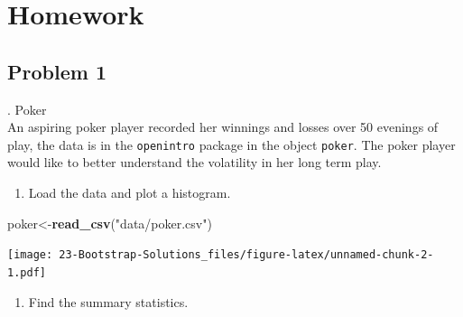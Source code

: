 \documentclass[
]{book}
\newenvironment{Shaded}{\begin{snugshade}}{\end{snugshade}}
\newcommand{\DataTypeTok}[1]{\textcolor[rgb]{0.13,0.29,0.53}{#1}}
\newcommand{\KeywordTok}[1]{\textcolor[rgb]{0.13,0.29,0.53}{\textbf{#1}}}
\newcommand{\NormalTok}[1]{#1}
\newcommand{\OperatorTok}[1]{\textcolor[rgb]{0.81,0.36,0.00}{\textbf{#1}}}
\newcommand{\StringTok}[1]{\textcolor[rgb]{0.31,0.60,0.02}{#1}}
\providecommand{\tightlist}{%
  \setlength{\itemsep}{0pt}\setlength{\parskip}{0pt}}
\begin{document}
\hypertarget{homework-22}{%
\section{Homework}\label{homework-22}}

\hypertarget{problem-1-22}{%
\subsection{Problem 1}\label{problem-1-22}}

. Poker\\
An aspiring poker player recorded her winnings and losses over 50 evenings of play, the data is in the \texttt{openintro} package in the object \texttt{poker}. The poker player would like to better understand the volatility in her long term play.

\begin{enumerate}
\def\labelenumi{\alph{enumi}.}
\tightlist
\item
  Load the data and plot a histogram.
\end{enumerate}

\begin{Shaded}
\begin{Highlighting}[]
\NormalTok{poker<-}\KeywordTok{read_csv}\NormalTok{(}\StringTok{"data/poker.csv"}\NormalTok{)}
\end{Highlighting}
\end{Shaded}

\begin{Shaded}
\end{Shaded}

\texttt{[image: 23-Bootstrap-Solutions\_files/figure-latex/unnamed-chunk-2-1.pdf]}

\begin{enumerate}
\def\labelenumi{\alph{enumi}.}
\setcounter{enumi}{1}
\tightlist
\item
  Find the summary statistics.
\end{enumerate}
\end{document}
